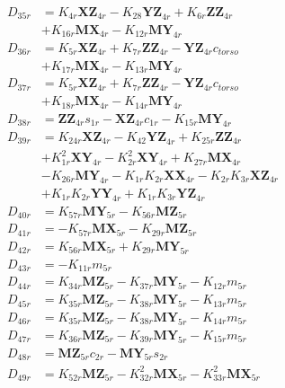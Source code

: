 \begin{multicols}{2}
\begin{align}
D_{35r} &= K_{4r}\mathbf{XZ}_{4r} - K_{28}\mathbf{YZ}_{4r} + K_{6r}\mathbf{ZZ}_{4r}  \nonumber \\
&+ K_{16r}\mathbf{MX}_{4r} - K_{12r}\mathbf{MY}_{4r} \nonumber \\
D_{36r} &= K_{5r}\mathbf{XZ}_{4r} + K_{7r}\mathbf{ZZ}_{4r} - \mathbf{YZ}_{4r}c_{torso}  \nonumber \\
&+ K_{17r}\mathbf{MX}_{4r} - K_{13r}\mathbf{MY}_{4r} \nonumber \\
D_{37r} &= K_{5r}\mathbf{XZ}_{4r} + K_{7r}\mathbf{ZZ}_{4r} - \mathbf{YZ}_{4r}c_{torso}  \nonumber \\
&+ K_{18r}\mathbf{MX}_{4r} - K_{14r}\mathbf{MY}_{4r} \nonumber \\
D_{38r} &= \mathbf{ZZ}_{4r}s_{1r} - \mathbf{XZ}_{4r}c_{1r} - K_{15r}\mathbf{MY}_{4r} \nonumber \\
D_{39r} &= K_{24r}\mathbf{XZ}_{4r} - K_{42}\mathbf{YZ}_{4r} + K_{25r}\mathbf{ZZ}_{4r}  \nonumber \\
&+ K_{1r}^2\mathbf{XY}_{4r} - K_{2r}^2\mathbf{XY}_{4r} + K_{27r}\mathbf{MX}_{4r}  \nonumber \\
&- K_{26r}\mathbf{MY}_{4r} - K_{1r}K_{2r}\mathbf{XX}_{4r} - K_{2r}K_{3r}\mathbf{XZ}_{4r}  \nonumber \\
&+ K_{1r}K_{2r}\mathbf{YY}_{4r} + K_{1r}K_{3r}\mathbf{YZ}_{4r} \nonumber \\
D_{40r} &= K_{57r}\mathbf{MY}_{5r} - K_{56r}\mathbf{MZ}_{5r} \nonumber \\
D_{41r} &= - K_{57r}\mathbf{MX}_{5r} - K_{29r}\mathbf{MZ}_{5r} \nonumber \\
D_{42r} &= K_{56r}\mathbf{MX}_{5r} + K_{29r}\mathbf{MY}_{5r} \nonumber \\
D_{43r} &= -K_{11r}m_{5r} \nonumber \\
D_{44r} &= K_{34r}\mathbf{MZ}_{5r} - K_{37r}\mathbf{MY}_{5r} - K_{12r}m_{5r} \nonumber \\
D_{45r} &= K_{35r}\mathbf{MZ}_{5r} - K_{38r}\mathbf{MY}_{5r} - K_{13r}m_{5r} \nonumber \\
D_{46r} &= K_{35r}\mathbf{MZ}_{5r} - K_{38r}\mathbf{MY}_{5r} - K_{14r}m_{5r} \nonumber \\
D_{47r} &= K_{36r}\mathbf{MZ}_{5r} - K_{39r}\mathbf{MY}_{5r} - K_{15r}m_{5r} \nonumber \\
D_{48r} &= \mathbf{MZ}_{5r}c_{2r} - \mathbf{MY}_{5r}s_{2r} \nonumber \\
D_{49r} &= K_{52r}\mathbf{MZ}_{5r} - K_{32r}^2\mathbf{MX}_{5r} - K_{33r}^2\mathbf{MX}_{5r}  \nonumber \\

\end{align}
\end{multicols}
